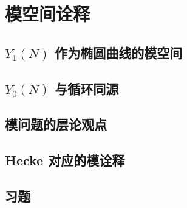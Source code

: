 \chapter{模空间诠释}
\label{ch:moduli-interpretation}

\section{$Y_1(N)$ 作为椭圆曲线的模空间}


\section{$Y_0(N)$ 与循环同源}


\section{模问题的层论观点}


\section{Hecke 对应的模诠释}


\section{习题}
